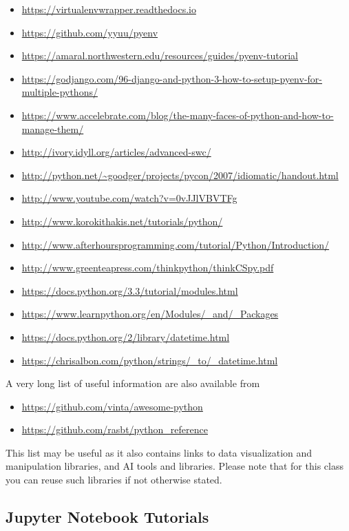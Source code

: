 \begin{itemize}
\item
  \url{https://virtualenvwrapper.readthedocs.io}
\item
  \url{https://github.com/yyuu/pyenv}
\item
  \url{https://amaral.northwestern.edu/resources/guides/pyenv-tutorial}
\item
  \url{https://godjango.com/96-django-and-python-3-how-to-setup-pyenv-for-multiple-pythons/}
\item
  \url{https://www.accelebrate.com/blog/the-many-faces-of-python-and-how-to-manage-them/}
\item
  \url{http://ivory.idyll.org/articles/advanced-swc/}
\item
  \url{http://python.net/~goodger/projects/pycon/2007/idiomatic/handout.html}
\item
  \url{http://www.youtube.com/watch?v=0vJJlVBVTFg}
\item
  \url{http://www.korokithakis.net/tutorials/python/}
\item
  \url{http://www.afterhoursprogramming.com/tutorial/Python/Introduction/}
\item
  \url{http://www.greenteapress.com/thinkpython/thinkCSpy.pdf}
\item
  \url{https://docs.python.org/3.3/tutorial/modules.html}
\item
  \url{https://www.learnpython.org/en/Modules/_and/_Packages}
\item
  \url{https://docs.python.org/2/library/datetime.html}
\item
  \url{https://chrisalbon.com/python/strings/_to/_datetime.html}
\end{itemize}

A very long list of useful information are also available from

\begin{itemize}
\item
  \url{https://github.com/vinta/awesome-python}
\item
  \url{https://github.com/rasbt/python_reference}
\end{itemize}

This list may be useful as it also contains links to data visualization
and manipulation libraries, and AI tools and libraries. Please note that
for this class you can reuse such libraries if not otherwise stated.

\subsection{Jupyter Notebook Tutorials}\label{jupyter-notebook-tutorials}

